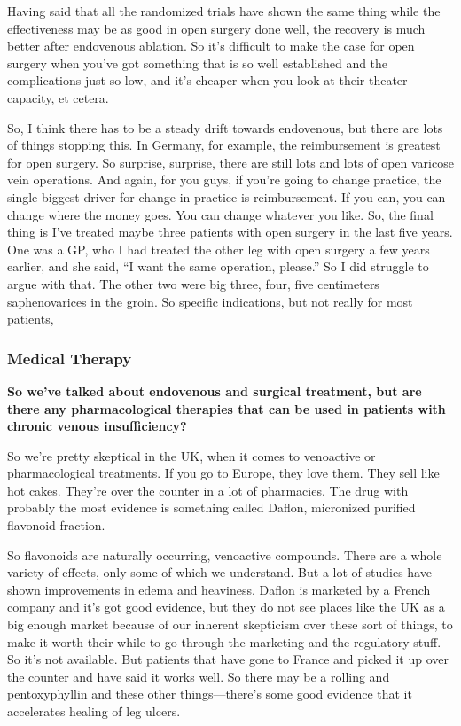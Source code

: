 \documentclass[
]{book}
\begin{document}
Having said that all the randomized trials have shown the same thing
while the effectiveness may be as good in open surgery done well, the
recovery is much better after endovenous ablation. So it's difficult to
make the case for open surgery when you've got something that is so well
established and the complications just so low, and it's cheaper when you
look at their theater capacity, et cetera.

So, I think there has to be a steady drift towards endovenous, but there
are lots of things stopping this. In Germany, for example, the
reimbursement is greatest for open surgery. So surprise, surprise, there
are still lots and lots of open varicose vein operations. And again, for
you guys, if you're going to change practice, the single biggest driver
for change in practice is reimbursement. If you can, you can change
where the money goes. You can change whatever you like. So, the final
thing is I've treated maybe three patients with open surgery in the last
five years. One was a GP, who I had treated the other leg with open
surgery a few years earlier, and she said, ``I want the same operation,
please.'' So I did struggle to argue with that. The other two were big
three, four, five centimeters saphenovarices in the groin. So specific
indications, but not really for most patients,

\hypertarget{medical-therapy}{%
\subsubsection{Medical Therapy}\label{medical-therapy}}

\textbf{So we've talked about endovenous and surgical treatment, but are there
any pharmacological therapies that can be used in patients with chronic
venous insufficiency?}

So we're pretty skeptical in the UK, when it comes to venoactive or
pharmacological treatments. If you go to Europe, they love them. They
sell like hot cakes. They're over the counter in a lot of pharmacies.
The drug with probably the most evidence is something called Daflon,
micronized purified flavonoid fraction.

So flavonoids are naturally occurring, venoactive compounds. There are a
whole variety of effects, only some of which we understand. But a lot of
studies have shown improvements in edema and heaviness. Daflon is
marketed by a French company and it's got good evidence, but they do not
see places like the UK as a big enough market because of our inherent
skepticism over these sort of things, to make it worth their while to go
through the marketing and the regulatory stuff. So it's not available.
But patients that have gone to France and picked it up over the counter
and have said it works well. So there may be a rolling and
pentoxyphyllin and these other things---there's some good evidence that
it accelerates healing of leg ulcers.
\end{document}
